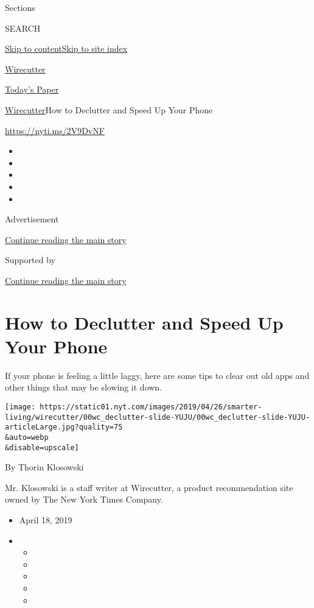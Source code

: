 Sections

SEARCH

\protect\hyperlink{site-content}{Skip to
content}\protect\hyperlink{site-index}{Skip to site index}

\href{https://www.nytimes.com/wirecutter/}{Wirecutter}

\href{https://myaccount.nytimes.com/auth/login?response_type=cookie\&client_id=vi}{}

\href{https://www.nytimes.com/section/todayspaper}{Today's Paper}

\href{/wirecutter/}{Wirecutter}\textbar{}How to Declutter and Speed Up
Your Phone

\url{https://nyti.ms/2V9DvNF}

\begin{itemize}
\item
\item
\item
\item
\item
\end{itemize}

Advertisement

\protect\hyperlink{after-top}{Continue reading the main story}

Supported by

\protect\hyperlink{after-sponsor}{Continue reading the main story}

\hypertarget{how-to-declutter-and-speed-up-your-phone}{%
\section{How to Declutter and Speed Up Your
Phone}\label{how-to-declutter-and-speed-up-your-phone}}

If your phone is feeling a little laggy, here are some tips to clear out
old apps and other things that may be slowing it down.

\texttt{[image: https://static01.nyt.com/images/2019/04/26/smarter-living/wirecutter/00wc\_declutter-slide-YUJU/00wc\_declutter-slide-YUJU-articleLarge.jpg?quality=75\\\&auto=webp\\\&disable=upscale]}

By Thorin Klosowski

Mr. Klosowski is a staff writer at Wirecutter, a product recommendation
site owned by The New York Times Company.

\begin{itemize}
\item
  April 18, 2019
\item
  \begin{itemize}
  \item
  \item
  \item
  \item
  \item
  \end{itemize}
\end{itemize}


